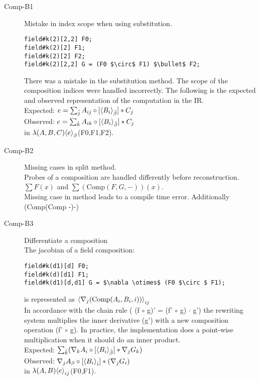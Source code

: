 \begin{description}
\item[Comp-B1] Mistake in index scope when using substitution.
\begin{lstlisting}
field#k(2)[2,2] F0;
field#k(2)[2] F1;
field#k(2)[2] F2;
field#k(2)[2,2] G = (F0 $\circ$ F1) $\bullet$ F2;
\end{lstlisting}

There was a mistake in the substitution method.
The scope of the composition indices were handled incorrectly.
The following is the expected and observed representation of the computation in the \name{} IR.\\
Expected: $e=\sum_{\hat{j}} {A_{ij}}\circ [{\left\langle{B_i}\right\rangle}_{\hat{\beta}}] *C_j $\\
Observed: $e=\sum_{\hat{k}} {A_{ik}}\circ [{\left\langle{B_i}\right\rangle}_{\hat{\beta}}] *C_j$\\
in $\lambda(A,B,C){\left\langle{e}\right\rangle}_{\beta}$(F0,F1,F2). 
\item[Comp-B2] Missing cases in split method.\\
Probes of a composition are handled differently before reconstruction.\\
$\sum F(x)$ and $\sum (\text{Comp} (F,G,-))(x)$.\\
Missing case in method leads to a compile time error.
Additionally (Comp(Comp -)-)
\item[Comp-B3]  Differentiate a composition\\
The jacobian of a field composition:
\begin{lstlisting}
field#k(d1)[d] F0;
field#k(d)[d1] F1;
field#k(d1)[d,d1] G = $\nabla \otimes$ (F0 $\circ $ F1);
\end{lstlisting}
is represented as ${\left\langle{\nabla_j (\text{Comp}(A_i,B_i,i))}\right\rangle}_{ij}$\\
In accordance with the chain rule ( (f $\circ $ g)' = (f'  $\circ $ g) $\cdot$ g') the rewriting system multiplies the inner derivative (g') with a new composition operation (f'  $\circ $ g).
In practice, the implementation does a point-wise multiplication when it should do an inner product.\\
 Expected: $\sum_{\hat{k}} ({\nabla_k A_i}\circ [{\left\langle{B_i}\right\rangle}_{\hat{\beta}}] * \nabla_j G_k) $\\
Observed: ${\nabla_j  A_{\beta}}\circ [{\left\langle{B_i}\right\rangle}_{\hat{ i}}] * (\nabla_j G_i)$\\
in $\lambda(A,B){\left\langle{e}\right\rangle}_{ij}$(F0,F1). 
\end{description}
